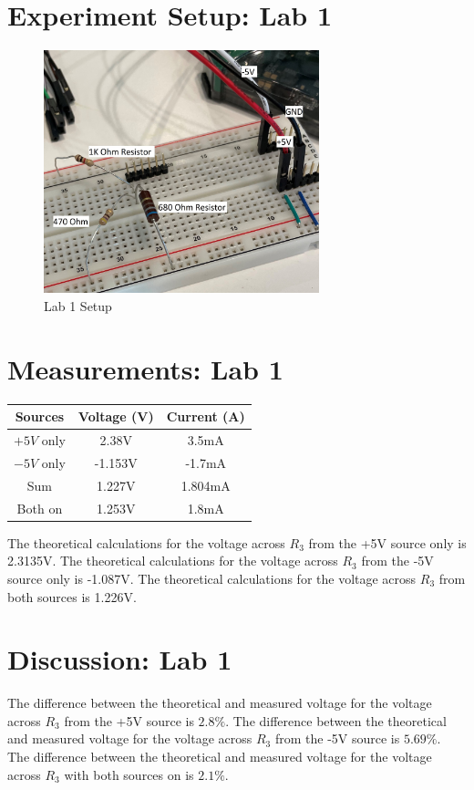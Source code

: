 \documentclass[12pt]{article}
\begin{document}
\section*{Experiment Setup: Lab 1}
\begin{figure}[h]
\includegraphics[width=8cm]{Lab 1}
\centering
\caption{Lab 1 Setup}
\end{figure}
\section*{Measurements: Lab 1}
\begin{center}
\begin{tabular}{||c|c|c ||}
\hline
Sources & Voltage (V) & Current (A)\\
\hline
\hline
$+5V$ only &2.38V &3.5mA\\
\hline
$-5V$ only &-1.153V &-1.7mA\\
\hline
Sum &1.227V &1.804mA\\
\hline
Both on & 1.253V&1.8mA\\
\hline
\end{tabular}
\end{center}
The theoretical calculations for the voltage across $R_3$ from the +5V source only is 2.3135V. The theoretical calculations for the voltage across $R_3$ from the -5V source only is -1.087V. The theoretical calculations for the voltage across $R_3$ from both sources is 1.226V.
\pagebreak
\section*{Discussion: Lab 1}
The difference between the theoretical and measured voltage for the voltage across $R_3$ from the +5V source is $2.8\%$. The difference between the theoretical and measured voltage for the voltage across $R_3$ from the -5V source is $5.69\%$.  The difference between the theoretical and measured voltage for the voltage across $R_3$ with both sources on is $2.1\%$.
\pagebreak
\end{document}

